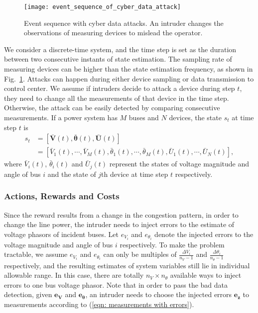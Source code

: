 \documentclass[conference,letterpaper,10pt]{IEEEtran}
\begin{document}
\begin{figure}	
	\centering
	\texttt{[image: event\_sequence\_of\_cyber\_data\_attack]}
	\caption{Event sequence with cyber data attacks. An intruder changes the observations of measuring devices to mislead the operator.}\vspace{-5mm}
	\label{fig:sequence}
\end{figure}


We consider a discrete-time system, and the time step is set as the duration between two consecutive instants of state estimation. The sampling rate of measuring devices can be higher than the state estimation frequency, as shown in Fig.~\ref{fig:sequence}. Attacks can happen during either  device sampling or  data transmission to control center. We assume if intruders decide to attack a device during step $t$, they need to change all the measurements of that device in the time step. Otherwise, the attack can be easily detected by comparing consecutive measurements. 
If a power system has $M$ buses and $N$  devices,  the state $s_t$ at time step $t$ is \begin{equation}\label{eqn: system state}
	\begin{split}
	s_t&= \left[\bar{\bm{V}}(t),\bar{\bm{\theta}}(t),\bar{\bm{U}}(t)\right]\\
	&=\left[\bar{V}_1(t),\cdots,\bar{V}_M(t),\bar{\theta}_1(t),\cdots,\bar{\theta}_M(t),\bar{U}_1(t), \cdots,\bar{U}_N(t)\right],
	\end{split}
\end{equation}
where $\bar{V}_i(t)$, $\bar{\theta}_i(t)$ and $\bar{U}_j(t)$ represent the states of voltage magnitude and angle of bus $i$ and the state of $j$th device at time step $t$ respectively. 

\subsubsection{Actions, Rewards and Costs}
Since the reward results from a change in the congestion pattern, in order to change the line power, the intruder needs to inject errors to the estimate of voltage phasors of incident buses. Let $e_{V_i}$ and $e_{\theta_i}$ denote the injected errors to the voltage magnitude and angle of bus $i$ respectively. To make the problem tractable, we assume $e_{V_i}$ and $e_{\theta_i}$ can only be multiples of $\frac{\Delta V_i}{n_V-1}$ and $\frac{\Delta \theta_i}{n_\theta-1}$  respectively, and the resulting estimates of system variables still lie in individual allowable range. In this case, there are totally $n_V\times n_\theta$ available ways to inject errors to one bus voltage phasor. Note that in order to pass the bad data detection, given $\bm{e_V}$ and $\bm{e_\theta}$, an intruder needs to choose the injected errors $\bm{e_z}$ to measurements according to (\ref{eqn: measurements with errors}).
\end{document}
